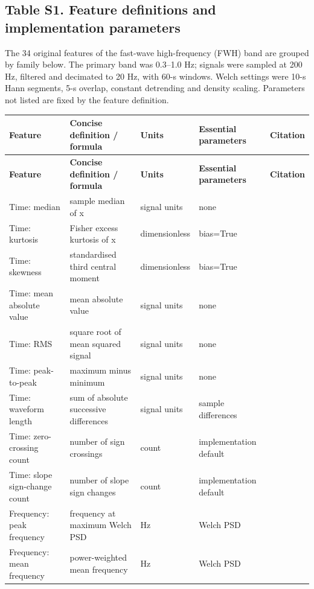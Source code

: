 \documentclass[10pt]{article}
\begin{document}
\clearpage
\begin{landscape}
\section*{Table S1. Feature definitions and implementation parameters}\label{tab:s1_features}
The 34 original features of the fast-wave high-frequency (FWH) band are grouped by family below. The primary band was 0.3--1.0 Hz; signals were sampled at 200 Hz, filtered and decimated to 20 Hz, with 60-s windows. Welch settings were 10-s Hann segments, 5-s overlap, constant detrending and density scaling. Parameters not listed are fixed by the feature definition.
\begin{longtable}{p{3.4cm}p{6.2cm}p{2.0cm}p{4.7cm}p{3.2cm}}
\toprule
\textbf{Feature} & \textbf{Concise definition / formula} & \textbf{Units} & \textbf{Essential parameters} & \textbf{Citation} \\
\midrule
\endfirsthead
\toprule
\textbf{Feature} & \textbf{Concise definition / formula} & \textbf{Units} & \textbf{Essential parameters} & \textbf{Citation} \\
\midrule
\endhead
Time: median & sample median of x & signal units & none &  \\
Time: kurtosis & Fisher excess kurtosis of x & dimensionless & bias=True &  \\
Time: skewness & standardised third central moment & dimensionless & bias=True &  \\
Time: mean absolute value & mean absolute value & signal units & none &  \\
Time: RMS & square root of mean squared signal & signal units & none & \citep{Hudgins1993NewStrategy} \\
Time: peak-to-peak & maximum minus minimum & signal units & none &  \\
Time: waveform length & sum of absolute successive differences & signal units & sample differences & \citep{Hudgins1993NewStrategy} \\
Time: zero-crossing count & number of sign crossings & count & implementation default &  \\
Time: slope sign-change count & number of slope sign changes & count & implementation default &  \\
Frequency: peak frequency & frequency at maximum Welch PSD & Hz & Welch PSD & \citep{Welch1967PSD} \\
Frequency: mean frequency & power-weighted mean frequency & Hz & Welch PSD & \citep{Welch1967PSD} \\

\end{longtable}
\end{landscape}
\end{document}
